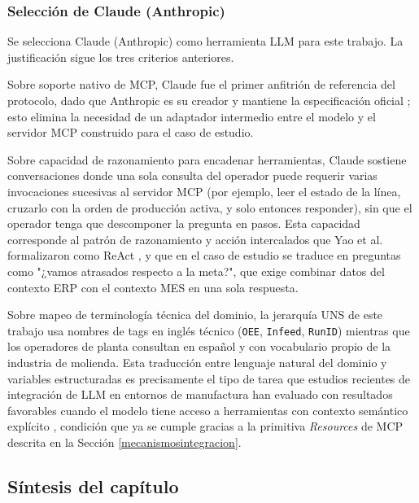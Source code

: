 \subsubsection{Selección de Claude (Anthropic)}

Se selecciona Claude (Anthropic) como herramienta LLM para este trabajo. La justificación sigue los tres criterios anteriores.

Sobre soporte nativo de MCP, Claude fue el primer anfitrión de referencia del protocolo, dado que Anthropic es su creador y mantiene la especificación oficial \cite{anthropic2024arch}; esto elimina la necesidad de un adaptador intermedio entre el modelo y el servidor MCP construido para el caso de estudio.

Sobre capacidad de razonamiento para encadenar herramientas, Claude sostiene conversaciones donde una sola consulta del operador puede requerir varias invocaciones sucesivas al servidor MCP (por ejemplo, leer el estado de la línea, cruzarlo con la orden de producción activa, y solo entonces responder), sin que el operador tenga que descomponer la pregunta en pasos. Esta capacidad corresponde al patrón de razonamiento y acción intercalados que Yao et al. formalizaron como ReAct \cite{YaoReAct2023}, y que en el caso de estudio se traduce en preguntas como "¿vamos atrasados respecto a la meta?", que exige combinar datos del contexto ERP con el contexto MES en una sola respuesta.

Sobre mapeo de terminología técnica del dominio, la jerarquía UNS de este trabajo usa nombres de tags en inglés técnico (\texttt{OEE}, \texttt{Infeed}, \texttt{RunID}) mientras que los operadores de planta consultan en español y con vocabulario propio de la industria de molienda. Esta traducción entre lenguaje natural del dominio y variables estructuradas es precisamente el tipo de tarea que estudios recientes de integración de LLM en entornos de manufactura han evaluado con resultados favorables cuando el modelo tiene acceso a herramientas con contexto semántico explícito \cite{AbuSalihSemanticLLM2025}, condición que ya se cumple gracias a la primitiva \textit{Resources} de MCP descrita en la Sección \ref{mecanismosintegracion}.

\subsection{Síntesis del capítulo}

